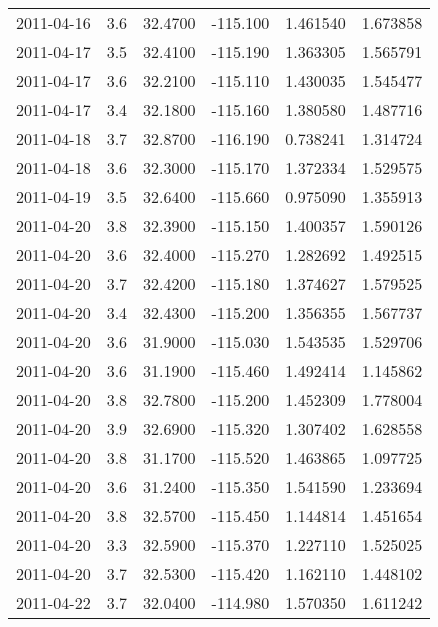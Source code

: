 \begin{tabular}{lrrrrr}
2011-04-16 &       3.6 &  32.4700 &  -115.100 &         1.461540 &         1.673858 \\
2011-04-17 &       3.5 &  32.4100 &  -115.190 &         1.363305 &         1.565791 \\
2011-04-17 &       3.6 &  32.2100 &  -115.110 &         1.430035 &         1.545477 \\
2011-04-17 &       3.4 &  32.1800 &  -115.160 &         1.380580 &         1.487716 \\
2011-04-18 &       3.7 &  32.8700 &  -116.190 &         0.738241 &         1.314724 \\
2011-04-18 &       3.6 &  32.3000 &  -115.170 &         1.372334 &         1.529575 \\
2011-04-19 &       3.5 &  32.6400 &  -115.660 &         0.975090 &         1.355913 \\
2011-04-20 &       3.8 &  32.3900 &  -115.150 &         1.400357 &         1.590126 \\
2011-04-20 &       3.6 &  32.4000 &  -115.270 &         1.282692 &         1.492515 \\
2011-04-20 &       3.7 &  32.4200 &  -115.180 &         1.374627 &         1.579525 \\
2011-04-20 &       3.4 &  32.4300 &  -115.200 &         1.356355 &         1.567737 \\
2011-04-20 &       3.6 &  31.9000 &  -115.030 &         1.543535 &         1.529706 \\
2011-04-20 &       3.6 &  31.1900 &  -115.460 &         1.492414 &         1.145862 \\
2011-04-20 &       3.8 &  32.7800 &  -115.200 &         1.452309 &         1.778004 \\
2011-04-20 &       3.9 &  32.6900 &  -115.320 &         1.307402 &         1.628558 \\
2011-04-20 &       3.8 &  31.1700 &  -115.520 &         1.463865 &         1.097725 \\
2011-04-20 &       3.6 &  31.2400 &  -115.350 &         1.541590 &         1.233694 \\
2011-04-20 &       3.8 &  32.5700 &  -115.450 &         1.144814 &         1.451654 \\
2011-04-20 &       3.3 &  32.5900 &  -115.370 &         1.227110 &         1.525025 \\
2011-04-20 &       3.7 &  32.5300 &  -115.420 &         1.162110 &         1.448102 \\
2011-04-22 &       3.7 &  32.0400 &  -114.980 &         1.570350 &         1.611242 \\

\end{tabular}
